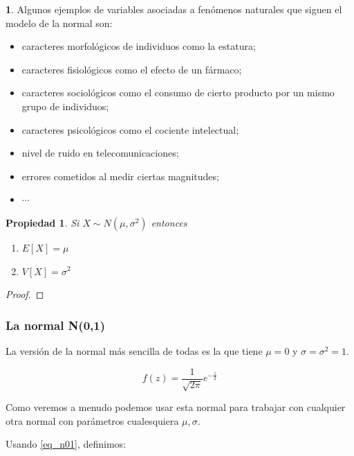 \documentclass[]{book}
\theoremstyle{plain}
\newtheorem{property}[theorem]{Propiedad}
\theoremstyle{definition}
\theoremstyle{definition} %
\newcommand{\thistheoremname}{}
\newtheorem{genericthm}[theorem]{\thistheoremname}
\newenvironment{customdef}[1]
  {\renewcommand{\thistheoremname}{#1}%
   \begin{genericthm}}
  {\end{genericthm}}
\begin{document}
\begin{customdef}{Aplicaciones de la Normal}
Algunos ejemplos de variables asociadas a fenómenos naturales que siguen
el modelo de la normal son:

\begin{itemize}
\item
  caracteres morfológicos de individuos como la estatura;
\item
  caracteres fisiológicos como el efecto de un fármaco;
\item
  caracteres sociológicos como el consumo de cierto producto por un
  mismo grupo de individuos;
\item
  caracteres psicológicos como el cociente intelectual;
\item
  nivel de ruido en telecomunicaciones;
\item
  errores cometidos al medir ciertas magnitudes;
  \item $\cdots$
\end{itemize}
\end{customdef}

\begin{property}
  Si $X \sim  N(\mu, \sigma^2)$ entonces 
  \begin{enumerate}
    \item $E[X] = \mu$
    \item $V[X] = \sigma^2$
  \end{enumerate}
\end{property}

\begin{proof}
   
\end{proof}

\subsubsection*{La normal N(0,1)}

La versión de la normal más sencilla de todas es la que tiene $\mu=0$ y $\sigma = \sigma^2 = 1$.

\begin{equation}\label{eq_n01}
  f(z) = \frac{1}{\sqrt{2\pi}} e^{-\frac{z}{2}}
\end{equation}
  
Como veremos a menudo podemos usar esta normal para trabajar con cualquier otra normal con parámetros cualesquiera $\mu, \sigma$.



Usando \ref{eq_n01}, definimos:
\end{document}
